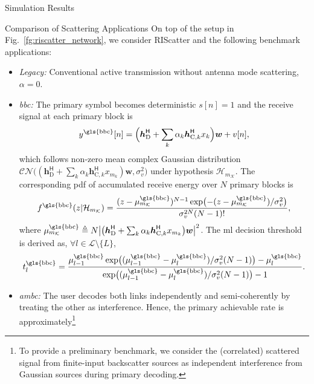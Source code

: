 \documentclass[journal]{IEEEtran}
\begin{document}
\begin{section}{Simulation Results}
	\begin{subsection}{Comparison of Scattering Applications}
		On top of the setup in Fig.~\ref{fg:riscatter_network}, we consider RIScatter and the following benchmark applications:
		\begin{itemize}
			\item \emph{Legacy:} Conventional active transmission without antenna mode scattering, $\alpha=0$.
			\item \emph{\gls{bbc}:} The primary symbol becomes deterministic $s[n]=1$ and the receive signal at each primary block is
			\begin{equation}
				y^{\text{\gls{bbc}}}[n] = \Bigl(\boldsymbol{h}_{\text{D}}^\mathsf{H} + \sum_{k} \alpha_k \boldsymbol{h}_{\text{C},k}^\mathsf{H} x_k\Bigr) \boldsymbol{w} + v[n],
			\end{equation}
			which follows non-zero mean complex Gaussian distribution $\mathcal{CN}\bigl((\boldsymbol{h}_{\text{D}}^\mathsf{H} + \sum_{k} \alpha_k \boldsymbol{h}_{\text{C},k}^\mathsf{H} x_{m_k}) \boldsymbol{w},\sigma_v^2\bigr)$ under hypothesis $\mathcal{H}_{m_{\mathcal{K}}}$.
			The corresponding \gls{pdf} of accumulated receive energy over $N$ primary blocks is
			\begin{equation}
				f^{\text{\gls{bbc}}}(z|\mathcal{H}_{m_{\mathcal{K}}}) = \frac{(z-\mu_{m_{\mathcal{K}}}^{\text{\gls{bbc}}})^{N-1} \exp \bigl(-(z-\mu_{m_{\mathcal{K}}}^{\text{\gls{bbc}}})/\sigma_v^2 \bigr)}{\sigma_v^{2N} (N-1)!},
				\label{eq:energy_distribution_bbc}
			\end{equation}
			where $\mu_{m_{\mathcal{K}}}^{\text{\gls{bbc}}} \triangleq N \bigl\lvert \bigl(\boldsymbol{h}_{\text{D}}^\mathsf{H} + \sum_{k} \alpha_k \boldsymbol{h}_{\text{C},k}^\mathsf{H} x_{m_k}\bigr) \boldsymbol{w} \bigr\rvert^2$.
			The \gls{ml} decision threshold is derived as, $\forall l \in \mathcal{L} \setminus \{L\}$,
			\begin{equation}
				t_l^{\text{\gls{bbc}}} = \frac{\mu_{l-1}^{\text{\gls{bbc}}} \exp \bigl((\mu_{l-1}^{\text{\gls{bbc}}}-\mu_{l}^{\text{\gls{bbc}}})/\sigma_v^2 (N-1)\bigr) - \mu_{l}^{\text{\gls{bbc}}}}{\exp \bigl((\mu_{l-1}^{\text{\gls{bbc}}}-\mu_{l}^{\text{\gls{bbc}}})/\sigma_v^2 (N-1)\bigr) - 1}.
				\label{eq:detection_threshold_ml_bbc}
			\end{equation}
			\item \emph{\gls{ambc}:} The user decodes both links independently and semi-coherently by treating the other as interference.
			Hence, the primary achievable rate is approximately\footnote{To provide a preliminary benchmark, we consider the (correlated) scattered signal from finite-input backscatter sources as independent interference from Gaussian sources during primary decoding.}

\end{itemize}
\end{subsection}
\end{section}
\end{document}

